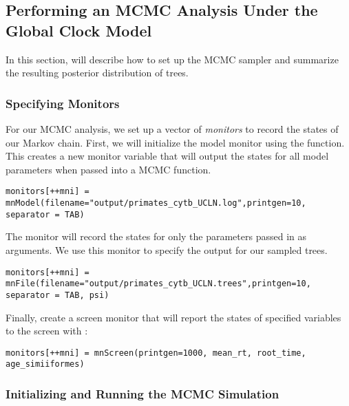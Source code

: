\bigskip
\subsection{Performing an MCMC Analysis Under the Global Clock Model}

In this section, will describe how to set up the MCMC sampler and summarize the resulting posterior distribution of trees. 

\subsubsection{Specifying Monitors}

For our MCMC analysis, we set up a vector of \textit{monitors} to record the states of our Markov chain. 
First, we will initialize the model monitor using the  function. 
This creates a new monitor variable that will output the states for all model parameters when passed into a MCMC function. 
{\tt \begin{snugshade*}
\begin{lstlisting}
monitors[++mni] = mnModel(filename="output/primates_cytb_UCLN.log",printgen=10, separator = TAB)
\end{lstlisting}
\end{snugshade*}}

The  monitor will record the states for only the parameters passed in as arguments. 
We use this monitor to specify the output for our sampled trees.
{\tt \begin{snugshade*}
\begin{lstlisting}
monitors[++mni] = mnFile(filename="output/primates_cytb_UCLN.trees",printgen=10, separator = TAB, psi)
\end{lstlisting}
\end{snugshade*}}

Finally, create a screen monitor that will report the states of specified variables to the screen with :
{\tt \begin{snugshade*}
\begin{lstlisting}
monitors[++mni] = mnScreen(printgen=1000, mean_rt, root_time, age_simiiformes)
\end{lstlisting}
\end{snugshade*}}

\subsubsection{Initializing and Running the MCMC Simulation}


